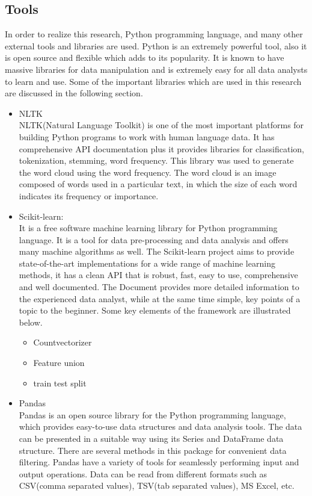 \subsection{Tools}
In order to realize this research, Python programming language, and many other external tools and libraries are used. Python is an extremely powerful tool, also it is open source and flexible which adds to its popularity. It is known to have massive libraries for data manipulation and is extremely easy for all data analysts to learn and use. Some of the important libraries which are used in this research are discussed in the following section.  


\begin{itemize}
    \item NLTK \\
    NLTK(Natural Language Toolkit) is one of the most important platforms for building Python programs to work with human language data. It has comprehensive API documentation plus it provides libraries for classification, tokenization, stemming, word frequency. This library was used to generate the word cloud using the word frequency. The word cloud is an image composed of words used in a particular text, in which the size of each word indicates its frequency or importance.
    
  
    \item Scikit-learn: \\
    It  \cite{scikit-learn} is a free software machine learning library for Python programming language. It is a tool for data pre-processing and data analysis and offers many machine algorithms as well. The Scikit-learn project aims to provide state-of-the-art implementations for a wide range of machine learning methods, it has a clean API that is robust, fast, easy to use, comprehensive and well documented. The Document provides more detailed information to the experienced data analyst, while at the same time simple, key points of a topic to the beginner. Some key elements of the framework are illustrated below.
    
    \begin{itemize}
        \item Countvectorizer
        \item Feature union
        \item train test split
    \end{itemize}
    
    
 
    
    \item Pandas \\
   Pandas \cite{pythonpandas} is an open source library for the Python programming language, which provides easy-to-use data structures and data analysis tools. The data can be presented in a suitable way using its Series and DataFrame data structure.
  There are several methods in this package for convenient data filtering. Pandas have a variety of tools for seamlessly performing input and output operations. Data can be read from different formats such as CSV(comma separated values), TSV(tab separated values), MS Excel, etc.



\end{itemize}
